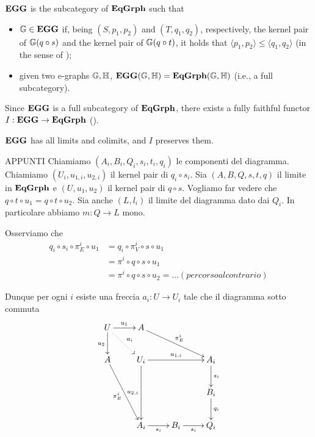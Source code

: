 \begin{definition}\label{def:cat_of_eggs}
    $\mathbf{EGG}$ is the subcategory of $\mathbf{EqGrph}$ such that
	\begin{itemize}
		\item $\mathbb{G} \in \mathbf{EGG}$ if, being $(S, p_1, p_2)$ and $(T, q_1, q_2)$, respectively, the kernel pair of $\mathbb{G}(q \circ s)$ and the kernel pair of $\mathbb{G}(q \circ t)$, it holds that $\langle p_1, p_2 \rangle \leq \langle q_1, q_2 \rangle$ (in the sense of );
		\item given two e-graphs $\mathbb{G, H}$, $\mathbf{EGG}(\mathbb{G, H}) =\mathbf{EqGrph}(\mathbb{G, H})$ (i.e., a full subcategory).
	\end{itemize}
\end{definition}

Since $\mathbf{EGG}$ is a full subcategory of $\mathbf{EqGrph}$, there exists a fully faithful functor $I: \mathbf{EGG} \to \mathbf{EqGrph}$ ().

\begin{lemma}
	$\mathbf{EGG}$ has all limits and colimits, and $I$ preserves them.
\end{lemma}


APPUNTI
Chiamiamo $(A_i, B_i, Q_i, s_i, t_i, q_i)$ le componenti del diagramma. Chiamiamo $(U_i, u_{1, i} , u_{2,i})$ il kernel pair di $q_i\circ s_i$.  Sia $(A, B, Q, s,t,q )$ il limite in $\mathbf{EqGrph}$ e $(U, u_1, u_2)$ il kernel pair di $q\circ s$. Vogliamo far vedere che $q\circ t \circ u_1= q\circ t\circ u_2$. Sia anche $(L, l_i)$ il limite del diagramma dato dai $Q_i$. In particolare abbiamo $m\colon Q\to L$ mono.

Osserviamo che 
\begin{align*}
q_i\circ s_i\circ \pi^i_E\circ u_1 &= q_i\circ \pi^i_V\circ s\circ u_1\\&= \pi^i\circ q\circ s\circ u_1\\&=\pi^i\circ q\circ s\circ u_2=\dots (percorso al contrario)
\end{align*}

Dunque per ogni $i$ esiste una freccia $a_i\colon U\to U_{i}$ tale che il diagramma sotto commuta
\[
\xymatrix{U \ar@{.>}[dr]^{a_i}\ar[r]^{u_1} \ar[d]_{u_2}& A \ar[drr]^{\pi^i_E}\\A \ar[ddr]_{\pi^i_E}&U_i \ar[dd]_{u_{2,i}} \ar[rr]^{u_{1,i}}& & A_i \ar[d]^{s_i}\\
& & &B_i \ar[d]^{q_i}\\&A_i \ar[r]_{s_i} & B_i \ar[r]_{s_i} & Q_i}
\]


